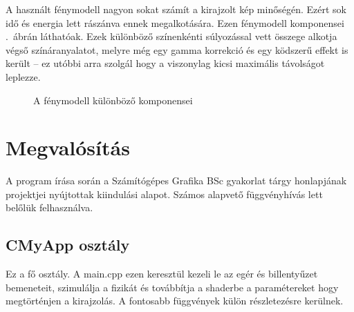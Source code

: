 A használt fénymodell nagyon sokat számít a kirajzolt kép minőségén. Ezért sok idő és energia lett rászánva ennek megalkotására. Ezen fénymodell komponensei .~ábrán láthatóak. Ezek különböző színenkénti súlyozással vett összege alkotja végső színáranyalatot, melyre még egy gamma korrekció és egy ködszerű effekt is került -- ez utóbbi arra szolgál hogy a viszonylag kicsi maximális távolságot leplezze.

\begin{figure}[H]
	\centering
	\hspace{1pt}
	\hspace{1pt}
	\vspace{1pt}
	\hspace{1pt}
	\hspace{1pt}
	\vspace{1pt}
	\hspace{1pt}
	\caption{A fénymodell különböző komponensei}
	\label{fig:lighting}
\end{figure}


\section{Megvalósítás}

A program írása során a Számítógépes Grafika BSc gyakorlat tárgy honlapjának \cite{GrafikaB26:online} projektjei nyújtottak kiindulási alapot. Számos alapvető függvényhívás lett belőlük felhasználva.

\subsection{CMyApp osztály}

Ez a fő osztály. A main.cpp ezen keresztül kezeli le az egér és billentyűzet bemeneteit, szimulálja a fizikát és továbbítja a shaderbe a paramétereket hogy megtörténjen a kirajzolás. A fontosabb függvények külön részletezésre kerülnek.

